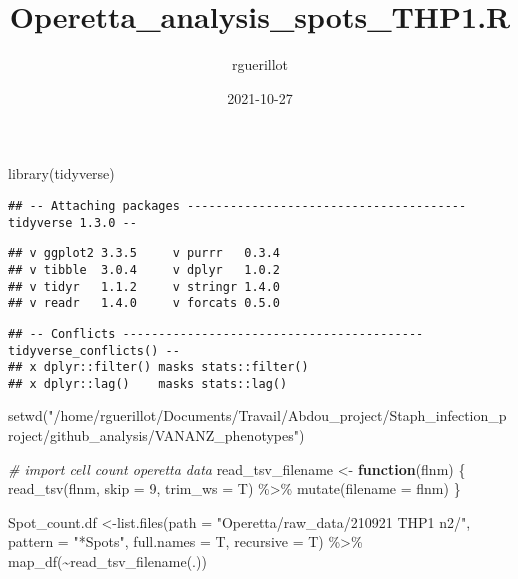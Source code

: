 \documentclass[
]{article}
\title{Operetta\_analysis\_spots\_THP1.R}
\author{rguerillot}
\date{2021-10-27}
\newenvironment{Shaded}{\begin{snugshade}}{\end{snugshade}}
\newcommand{\AttributeTok}[1]{\textcolor[rgb]{0.77,0.63,0.00}{#1}}
\newcommand{\CommentTok}[1]{\textcolor[rgb]{0.56,0.35,0.01}{\textit{#1}}}
\newcommand{\ControlFlowTok}[1]{\textcolor[rgb]{0.13,0.29,0.53}{\textbf{#1}}}
\newcommand{\DecValTok}[1]{\textcolor[rgb]{0.00,0.00,0.81}{#1}}
\newcommand{\FunctionTok}[1]{\textcolor[rgb]{0.00,0.00,0.00}{#1}}
\newcommand{\NormalTok}[1]{#1}
\newcommand{\OtherTok}[1]{\textcolor[rgb]{0.56,0.35,0.01}{#1}}
\newcommand{\SpecialCharTok}[1]{\textcolor[rgb]{0.00,0.00,0.00}{#1}}
\newcommand{\StringTok}[1]{\textcolor[rgb]{0.31,0.60,0.02}{#1}}
\begin{document}
\maketitle

\begin{Shaded}
\begin{Highlighting}[]
\FunctionTok{library}\NormalTok{(tidyverse)}
\end{Highlighting}
\end{Shaded}

\begin{verbatim}
## -- Attaching packages --------------------------------------- tidyverse 1.3.0 --
\end{verbatim}

\begin{verbatim}
## v ggplot2 3.3.5     v purrr   0.3.4
## v tibble  3.0.4     v dplyr   1.0.2
## v tidyr   1.1.2     v stringr 1.4.0
## v readr   1.4.0     v forcats 0.5.0
\end{verbatim}

\begin{verbatim}
## -- Conflicts ------------------------------------------ tidyverse_conflicts() --
## x dplyr::filter() masks stats::filter()
## x dplyr::lag()    masks stats::lag()
\end{verbatim}

\begin{Shaded}
\begin{Highlighting}[]
\FunctionTok{setwd}\NormalTok{(}\StringTok{"/home/rguerillot/Documents/Travail/Abdou\_project/Staph\_infection\_project/github\_analysis/VANANZ\_phenotypes"}\NormalTok{)}

\CommentTok{\# import cell count operetta data}
\NormalTok{read\_tsv\_filename }\OtherTok{\textless{}{-}} \ControlFlowTok{function}\NormalTok{(flnm) \{}
  \FunctionTok{read\_tsv}\NormalTok{(flnm, }\AttributeTok{skip =} \DecValTok{9}\NormalTok{, }\AttributeTok{trim\_ws =}\NormalTok{ T) }\SpecialCharTok{\%\textgreater{}\%} 
    \FunctionTok{mutate}\NormalTok{(}\AttributeTok{filename =}\NormalTok{ flnm)}
\NormalTok{\}}

\NormalTok{Spot\_count.df }\OtherTok{\textless{}{-}}\FunctionTok{list.files}\NormalTok{(}\AttributeTok{path =} \StringTok{"Operetta/raw\_data/210921 THP1 n2/"}\NormalTok{, }\AttributeTok{pattern =} \StringTok{"*Spots"}\NormalTok{, }\AttributeTok{full.names =}\NormalTok{ T, }\AttributeTok{recursive =}\NormalTok{ T) }\SpecialCharTok{\%\textgreater{}\%} 
  \FunctionTok{map\_df}\NormalTok{(}\SpecialCharTok{\textasciitilde{}}\FunctionTok{read\_tsv\_filename}\NormalTok{(.)) }
\end{Highlighting}
\end{Shaded}
\end{document}
